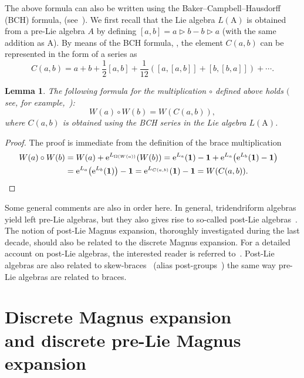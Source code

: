\documentclass[10pt,a4paper]{amsart}
\numberwithin{equation}{section}
\newtheorem{lem}[thm]{Lemma}
\theoremstyle{definition}
\begin{document}
The above formula can also be written using the Baker--Campbell--Hausdorff (BCH) formula, (see~\cite{Chrono, Manchon}). We first recall that the Lie algebra $L({\mathrm A})$ is obtained from a pre-Lie algebra $A$ by defining $[a,b]=a\triangleright b-b\triangleright a$ (with the same addition as ${\mathrm A}$).
By means of the BCH formula, , the element $C(a, b)$ can be represented in the form of a series as
\[
C(a,b)=a+b+{\frac 12}[a,b]+{\frac 1{12}}([a,[a,b]]+[b,[b,a]])+\cdots.
\]

\begin{lem}The following formula for the multiplication $\circ $ defined above holds $($see, for example,~\mbox{\rm \cite{Chrono, Manchon})}:
\[
W(a)\circ W(b)= W(C(a, b)),
\]
where $C(a, b)$ is obtained using the BCH series in the Lie algebra $L({\mathrm A})$.
\end{lem}
\begin{proof} The proof is immediate from the definition of the brace multiplication
\begin{align*}
W(a) \circ W(b) & = W(a) + {\rm e}^{L_{\Omega(W(a))}}(W(b)) = {\rm e}^{L_{a}}({\bf 1})-{\bf 1}
+ {\rm e}^{L_{a}}\bigl({\rm e}^{L_{b}}({\bf 1})-{\bf 1}\bigr)\cr
& = {\rm e}^{L_{a}}\bigl({\rm e}^{L_b}({\bf 1})\bigr)-{\bf 1}={\rm e}^{L_{C(a,b)}}({\bf 1})-{\bf 1} = W(C(a, b)). \nonumber
\tag*{\qed}
\end{align*}
\renewcommand{\qed}{}
\end{proof}

Some general comments are also in order here. In general, tridendriform algebras yield left pre-Lie algebras, but they also gives rise to so-called post-Lie algebras~\cite{p[2], p[3],p[5]}. The notion of post-Lie Magnus expansion, thoroughly investigated during the last decade, should also be related to the discrete Magnus expansion. For a
detailed account on post-Lie algebras, the interested reader is referred to~\cite{p[2], p[3], Ebf}. Post-Lie algebras are also related to skew-braces~\cite{p[4]} (alias post-groups~\cite{p[1]}) the same way pre-Lie algebras are related to braces.

\section[Discrete Magnus expansion and discrete pre-Lie Magnus expansion]{Discrete Magnus expansion\\ and discrete pre-Lie Magnus expansion}\label{section3}
\end{document}
